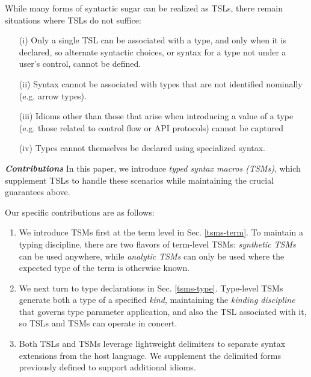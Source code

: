 \documentclass{sig-alternate}[10pt]
\begin{document}
While many forms of syntactic sugar can be realized as TSLs, there remain situations where TSLs do not suffice: 
\begin{enumerate}[noitemsep]
\item[(i)] Only a single TSL can be associated with a type, and only when it is declared, so alternate syntactic choices, or syntax for a type not under a user's control, cannot be defined.
\item[(ii)] Syntax cannot be associated with types that are not identified nominally (e.g. arrow types).
\item[(iii)] Idioms other than those that arise when introducing a value of a type (e.g. those related to control flow or API protocols) cannot be captured
\item[(iv)] Types cannot themselves be declared using specialized syntax. 
\end{enumerate}

\noindent\textbf{\textit{Contributions}} In this paper, we introduce \emph{typed syntax macros (TSMs)}, which supplement TSLs to handle these scenarios while maintaining the crucial guarantees above. 

Our specific contributions are as follows:%
\begin{enumerate}[noitemsep]
\item We introduce TSMs first at the term level in Sec. \ref{tsms-term}.  To maintain a typing discipline, there are two flavors of term-level TSMs: \emph{synthetic TSMs} can be used anywhere, while \emph{analytic TSMs} can only be used where the expected type of the term is otherwise known. 
\item We next turn to type declarations  in Sec. \ref{tsms-type}. Type-level TSMs generate both a type of a specified \emph{kind}, maintaining the \emph{kinding discipline} that governs type parameter application, and also the TSL associated with it, so TSLs and TSMs can operate in concert. %
\item Both TSLs and TSMs leverage lightweight delimiters to separate syntax extensions from the host language. We supplement the delimited forms previously defined to support additional idioms.
\end{enumerate}
\end{document}
